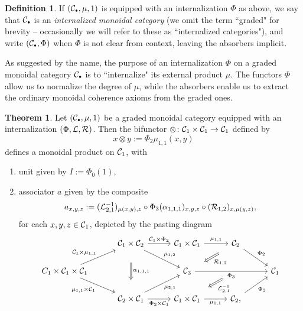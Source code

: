 \documentclass[openany, amssymb, psamsfonts]{amsart}
\theoremstyle{definition}
\newtheorem{thm}{Theorem}[section]
\newtheorem{defn}{Definition}[section]
\numberwithin{equation}{section}
\begin{document}
\begin{defn}
 If $(\C_\sbull, \mu, 1)$ is equipped with an internalization $\Phi$ as above, we say that $\C_\sbull$ is an \emph{internalized monoidal category} (we omit the term ``graded" for brevity -- occasionally we will refer to these as ``internalized categories"), and write $(\C_\sbull, \Phi)$ when $\Phi$ is not clear from context, leaving the absorbers implicit.
\end{defn}

As suggested by the name, the purpose of an internalization $\Phi$ on a graded monoidal category $\C_\smallbullet$ is to ``internalize" its external product $\mu$. The functors $\Phi$ allow us to normalize the degree of $\mu$, while the absorbers enable us to extract the ordinary monoidal coherence axioms from the graded ones.

\begin{thm}\label{thm:internalization}
Let $(\C_\sbull, \mu, 1)$ be a graded monoidal category equipped with an internalization $(\Phi, \mathcal{L}, \mathcal{R})$. Then the bifunctor $\otimes \colon \mathcal{C}_1 \times \mathcal{C}_1 \to \mathcal{C}_1$ defined by
\begin{equation*}
    x \otimes y := \Phi_2 \mu_{1, 1}(x, y)
\end{equation*} defines a monoidal product on $\mathcal{C}_1$, with
\begin{enumerate}
    \item unit given by $I := \Phi_0(1),$
    \item associator $a$ given by the composite
    \begin{equation*}
        a_{x, y, z} := (\mathcal{L}^{-1}_{2, 1})_{\mu(x, y), z} \circ \Phi_3 (\alpha_{1, 1, 1})_{x, y, z} \circ (\mathcal{R}_{1, 2})_{x, \mu(y, z)},
    \end{equation*} for each $x, y, z \in \mathcal{C}_1$, depicted by the pasting diagram
    \begin{equation*}
        \begin{tikzcd}[column sep = 2.8em]
            & \C_1 \times \C_2 \ar[r, "\C_1 \times \Phi_2"] \ar[dr, "\mu_{1, 2}"] \ar[dd, Rightarrow, shorten <= 3.5ex, shorten >= 3.5ex, "\alpha_{1, 1, 1}"] & \C_1 \times \C_1 \ar[r, "\mu_{1, 1}"] & \C_2 \ar[dr, "\Phi_2"] \ar[dl, Rightarrow, shorten <= 3ex, shorten >= 3ex, "\calR_{1, 2}"] \\
            C_1 \times \C_1 \times \C_1 \ar[ur, "\C_1 \times \mu_{1, 1}"] \ar[dr, "\mu_{1, 1} \times \C_1"'] && \C_3 \ar[rr, "\Phi_3"'] & {} \ar[dl, Rightarrow, shorten <= 3ex, shorten >= 3ex, "\calL_{2,1}^{-1}"] & \C_1\\
            & \C_2 \times \C_1 \ar[r, "\Phi_2 \times \C_1"'] \ar[ur, "\mu_{2, 1}"'] &  \C_1 \times \C_1 \ar[r, "\mu_{1, 1}"'] & \C_2, \ar[ur, "\Phi_2"']

\end{tikzcd}
\end{equation*}
\end{enumerate}
\end{thm}
\end{document}
